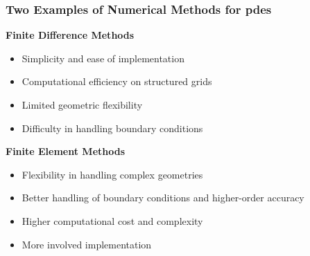 \begin{frame}
    \frametitle{Two Examples of Numerical Methods for \acrshort{pdes}}

    \vspace*{\fill}
    \begin{multicols}{2}

        \begin{center}
            {\color{\accentcolor} \Large \textbf{Finite Difference Methods}}
            \vspace*{0.5cm}

            \begin{minipage}{0.4\textwidth}
                \begin{itemize}
                    \color{\procolor}
                    \item Simplicity and ease of implementation
                    \item Computational efficiency on structured grids
                \end{itemize}
    
                \begin{itemize}
                    \color{\concolor}
                    \item Limited geometric flexibility
                    \item Difficulty in handling boundary conditions
                \end{itemize}
            \end{minipage}
        \end{center}

        \vfill\null
        \columnbreak

        \begin{center}
            {\color{\accentcolor} \Large \textbf{Finite Element Methods}}
            \vspace*{0.5cm}

            \begin{minipage}{0.4\textwidth}
                \begin{itemize}
                    \color{\procolor}
                    \item Flexibility in handling complex geometries
                    \item Better handling of boundary conditions and higher-order accuracy
                \end{itemize}

                \begin{itemize}
                    \color{\concolor}
                    \item Higher computational cost and complexity
                    \item More involved implementation
                \end{itemize}
            \end{minipage}
        \end{center}
    \end{multicols}
    \vspace*{\fill}
    
\end{frame}